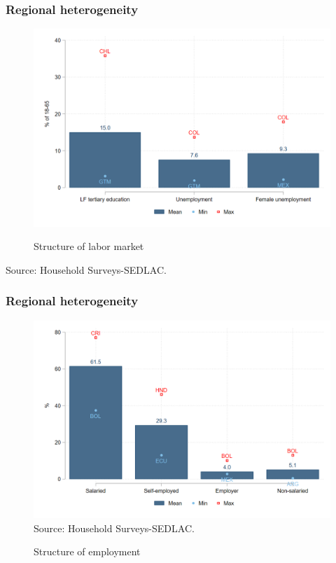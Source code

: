 \documentclass{beamer}
\begin{document}

\begin{frame}
\frametitle{Regional heterogeneity}
\begin{figure}[!htb]
\justifying
  \caption{Structure of labor market}
  \centering
  \includegraphics[width=0.8\linewidth]{latex/figures/Snapshot/Structure of labor market_b.png}
  \label{fig:labmarket2}
\end{figure}
  \centering
\footnotesize{Source: Household Surveys-SEDLAC.}


\end{frame}

\begin{frame}
\frametitle{Regional heterogeneity}
 \begin{figure}[!htb]
        \justifying
        \caption{Structure of employment}     
        \includegraphics[width=0.8\linewidth]
        {latex/figures/Snapshot/Structure of employment.png}
        \label{fig:employment}
        \centering
        \footnotesize{Source: Household Surveys-SEDLAC.}
\end{figure}
\end{frame}
     
\end{document}
